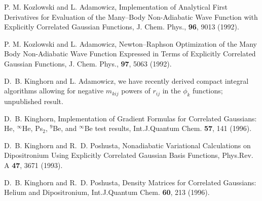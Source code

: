 \begin{thebibliography}{999}
P. M. Kozlowski and L. Adamowicz, 
Implementation of Analytical First Derivatives for
Evaluation of the Many--Body Non-Adiabatic Wave Function
with Explicitly Correlated Gaussian Functions,
J. Chem. Phys., {\bf 96}, 9013 (1992).

P. M. Kozlowski and L. Adamowicz, 
Newton--Raphson Optimization of the Many Body
Non-Adiabatic Wave Function Expressed in Terms of Explicitly
Correlated Gaussian Functions,
J. Chem. Phys., {\bf 97}, 5063 (1992).


%
%
%
%
%
%
%
%
%
%
%
%
%
%
%

D.~B. Kinghorn and L. Adamowicz, we have recently derived
compact integral algorithms allowing for negative $m_{kij}$ powers
of $r_{ij}$ in the $\phi_k$ functions; unpublished result.


D.~B. Kinghorn,
Implementation of Gradient Formulas for Correlated
Gaussians: He, $^{\infty}$He, Ps$_2$, $^9$Be, and $^{\infty}$Be
test results,
\newblock Int.J.Quantum Chem. {\bf 57}, 141 (1996).

D.~B. Kinghorn and R.~D. Poshusta,
Nonadiabatic Variational Calculations on Dipositronium
Using Explicitly Correlated Gaussian Basis Functions,
\newblock Phys.Rev. A {\bf 47}, 3671 (1993).

D.~B. Kinghorn and R.~D. Poshusta,
Density Matrices for Correlated Gaussians: Helium and
Dipositronium,
\newblock Int.J.Quantum Chem. {\bf 60}, 213 (1996).


\end{thebibliography}
